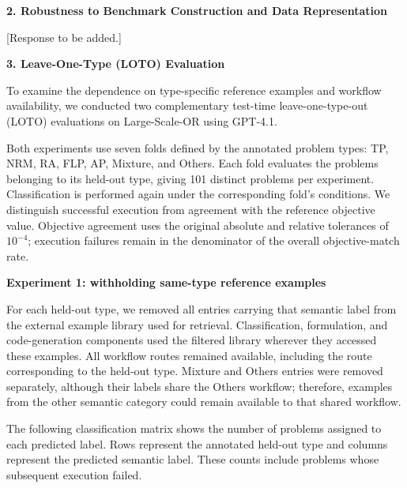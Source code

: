 \documentclass[11pt]{article}
\begin{document}
\begin{enumerate}[label=(AssoE.\arabic*),leftmargin=*]
\begin{enumerate}[label=(R1.Major.\arabic*),leftmargin=*]
\vspace{2mm}
\noindent\textbf{2. Robustness to Benchmark Construction and Data Representation}


[Response to be added.]

\vspace{2mm}
\noindent\textbf{3. Leave-One-Type (LOTO) Evaluation}

To examine the dependence on type-specific reference examples and workflow availability, we conducted two complementary test-time leave-one-type-out (LOTO) evaluations on Large-Scale-OR using GPT-4.1.

Both experiments use seven folds defined by the annotated problem types: TP, NRM, RA, FLP, AP, Mixture, and Others. Each fold evaluates the problems belonging to its held-out type, giving 101 distinct problems per experiment. Classification is performed again under the corresponding fold's conditions. We distinguish successful execution from agreement with the reference objective value. Objective agreement uses the original absolute and relative tolerances of \(10^{-4}\); execution failures remain in the denominator of the overall objective-match rate.

\medskip
\noindent\textbf{Experiment 1: withholding same-type reference examples}

For each held-out type, we removed all entries carrying that semantic label from the external example library used for retrieval. Classification, formulation, and code-generation components used the filtered library wherever they accessed these examples. All workflow routes remained available, including the route corresponding to the held-out type. Mixture and Others entries were removed separately, although their labels share the Others workflow; therefore, examples from the other semantic category could remain available to that shared workflow.

The following classification matrix shows the number of problems assigned to each predicted label. Rows represent the annotated held-out type and columns represent the predicted semantic label. These counts include problems whose subsequent execution failed.


\end{enumerate}
\end{enumerate}
\end{document}
